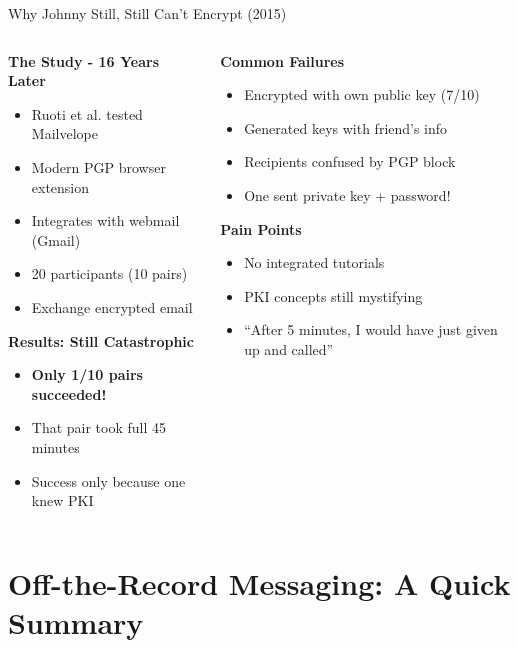 \documentclass[aspectratio=169, lualatex, handout]{beamer}
\begin{document}
\begin{frame}{Why Johnny Still, Still Can't Encrypt (2015)}
	\begin{columns}[T]
		\begin{column}{0.5\textwidth}
			\textbf{The Study - 16 Years Later}
			\begin{itemize}
				\item Ruoti et al. tested Mailvelope
				\item Modern PGP browser extension
				\item Integrates with webmail (Gmail)
				\item 20 participants (10 pairs)
				\item Exchange encrypted email
			\end{itemize}
			\textbf{Results: Still Catastrophic}
			\begin{itemize}
				\item \textbf{Only 1/10 pairs succeeded!}
				\item That pair took full 45 minutes
				\item Success only because one knew PKI
			\end{itemize}
		\end{column}
		\begin{column}{0.5\textwidth}
			\textbf{Common Failures}
			\begin{itemize}
				\item Encrypted with own public key (7/10)
				\item Generated keys with friend's info
				\item Recipients confused by PGP block
				\item One sent private key + password!
			\end{itemize}
			\textbf{Pain Points}
			\begin{itemize}
				\item No integrated tutorials
				\item PKI concepts still mystifying
				\item ``After 5 minutes, I would have just given up and called''
			\end{itemize}
		\end{column}
	\end{columns}
\end{frame}

\section{Off-the-Record Messaging: A Quick Summary}
\end{document}
